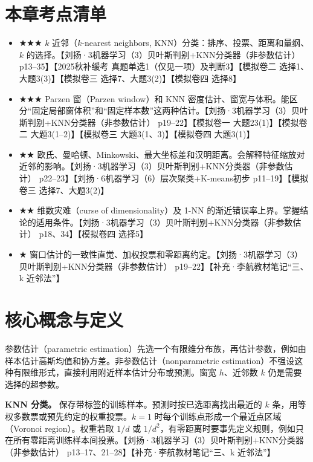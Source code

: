 \documentclass[UTF8,a4paper,zihao=-4,fontset=fandol]{ctexrep}
\begin{document}
\section{本章考点清单}
\begin{itemize}
\item \ensuremath{\bigstar\bigstar\bigstar} $k$ 近邻（$k$-nearest neighbors, KNN）分类：排序、投票、距离和量纲、$k$ 的选择。【刘扬·3机器学习（3）贝叶斯判别+KNN分类器（非参数估计） p13–35】【2025秋补缓考 真题单选1（仅见一项）及判断3】【模拟卷二 选择1、大题3(3)】【模拟卷三 选择7、大题3(2)】【模拟卷四 选择8】
\item \ensuremath{\bigstar\bigstar\bigstar} Parzen 窗（Parzen window）和 KNN 密度估计、窗宽与体积。能区分“固定局部窗体积”和“固定样本数”这两种估计。【刘扬·3机器学习（3）贝叶斯判别+KNN分类器（非参数估计） p19–22】【模拟卷一 大题23(1)】【模拟卷二 大题3(1–2)】【模拟卷三 大题3(1、3)】【模拟卷四 大题3(1)】
\item \ensuremath{\bigstar\bigstar} 欧氏、曼哈顿、Minkowski、最大坐标差和汉明距离。会解释特征缩放对近邻的影响。【刘扬·3机器学习（3）贝叶斯判别+KNN分类器（非参数估计） p22–23】【刘扬·6机器学习（6）层次聚类+K-means初步 p11–19】【模拟卷三 选择7、大题3(2)】
\item \ensuremath{\bigstar\bigstar} 维数灾难（curse of dimensionality）及 1-NN 的渐近错误率上界。掌握结论的适用条件。【刘扬·3机器学习（3）贝叶斯判别+KNN分类器（非参数估计） p18、34】【模拟卷四 选择5】
\item \ensuremath{\bigstar} 窗口估计的一致性直觉、加权投票和零距离约定。【刘扬·3机器学习（3）贝叶斯判别+KNN分类器（非参数估计） p19–22】【补充·李航教材笔记“三、k 近邻法”】
\end{itemize}

\section{核心概念与定义}
参数估计（parametric estimation）先选一个有限维分布族，再估计参数，例如由样本估计高斯均值和协方差。非参数估计（nonparametric estimation）不强设这种有限维形式，直接利用附近样本估计分布或预测。窗宽 $h$、近邻数 $k$ 仍是需要选择的超参数。

\textbf{KNN 分类。} 保存带标签的训练样本。预测时按已选距离找出最近的 $k$ 条，用等权多数票或预先约定的权重投票。$k=1$ 时每个训练点形成一个最近点区域（Voronoi region）。权重若取 $1/d$ 或 $1/d^2$，有零距离时要事先定义规则，例如只在所有零距离训练样本间投票。【刘扬·3机器学习（3）贝叶斯判别+KNN分类器（非参数估计） p13–17、21–28】【补充·李航教材笔记“三、k 近邻法”】
\end{document}
